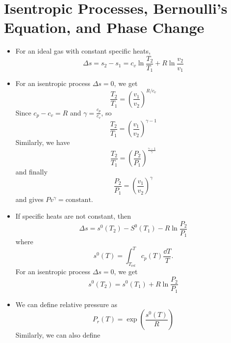 \section{Isentropic Processes, Bernoulli's Equation, and Phase Change}
\begin{itemize}
    \item For an ideal gas with constant specific heats, 
    \begin{equation}
        \Delta s = s_2- s_1 = c_v\ln\frac{T_2}{T_1} + R\ln\frac{v_2}{v_1}
    \end{equation}
    \item For an isentropic process $\Delta s=0$, we get 
    \begin{equation}
        \frac{T_2}{T_1} = \left(\frac{v_1}{v_2}\right)^{R/c_v}
    \end{equation}
    Since $c_p-c_v=R$ and $\gamma = \frac{c_p}{c_v}$, so 
    \begin{equation}
        \boxed{\frac{T_2}{T_1} = \left(\frac{v_1}{v_2}\right)^{\gamma-1}}
    \end{equation}
    Similarly, we have 
    \begin{equation}
        \boxed{\frac{T_2}{T_1} = \left(\frac{P_2}{P_1}\right)^{\frac{\gamma-1}{\gamma}}}
    \end{equation}
    and finally 
    \begin{equation}
    \boxed{\frac{P_2}{P_1}=\left(\frac{v_1}{v_2}\right)^\gamma}
    \end{equation}
    and gives $Pv^\gamma = \text{constant}.$
    \item If specific heats are not constant, then 
    \begin{equation}
        \Delta s = s^0(T_2)-S^0(T_1)-R\ln\frac{P_2}{P_1}
    \end{equation}
    where 
    \begin{equation}
        s^0(T) = \int_{T_\text{ref}}^T c_p(T) \frac{\dd{T}}{T}.
    \end{equation}
    For an isentropic process $\Delta s=0$, we get 
    \begin{equation}
        s^0(T_2)=s^0(T_1)+R\ln\frac{P_2}{P_1}
    \end{equation}
    \item We can define relative pressure as
    \begin{equation}
        P_r(T) = \exp\left(\frac{s^0(T)}{R}\right)
    \end{equation}
    Similarly, we can also define 
    \begin{equation}

\end{equation}
\end{itemize}
